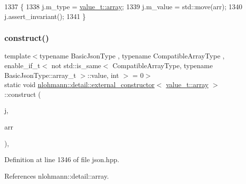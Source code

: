 \begin{DoxyCode}
1337     \{
1338         j.m\_type = \hyperlink{namespacenlohmann_1_1detail_a1ed8fc6239da25abcaf681d30ace4985af1f713c9e000f5d3f280adbd124df4f5}{value\_t::array};
1339         j.m\_value = std::move(arr);
1340         j.assert\_invariant();
1341     \}
\end{DoxyCode}
\mbox{\label{structnlohmann_1_1detail_1_1external__constructor_3_01value__t_1_1array_01_4_a110f50fd5378da876d9a6d6a8d945e37}} 
\subsubsection{\texorpdfstring{construct()}{construct()}\hspace{0.1cm}{\footnotesize\ttfamily [3/5]}}
{\footnotesize\ttfamily template$<$typename Basic\+Json\+Type , typename Compatible\+Array\+Type , enable\+\_\+if\+\_\+t$<$ not std\+::is\+\_\+same$<$ Compatible\+Array\+Type, typename Basic\+Json\+Type\+::array\+\_\+t $>$\+::value, int $>$  = 0$>$ \\
static void \hyperlink{structnlohmann_1_1detail_1_1external__constructor}{nlohmann\+::detail\+::external\+\_\+constructor}$<$ \hyperlink{namespacenlohmann_1_1detail_a1ed8fc6239da25abcaf681d30ace4985af1f713c9e000f5d3f280adbd124df4f5}{value\+\_\+t\+::array} $>$\+::construct (\begin{DoxyParamCaption}\item[{Basic\+Json\+Type \&}]{j,  }\item[{const Compatible\+Array\+Type \&}]{arr }\end{DoxyParamCaption})\hspace{0.3cm}{\ttfamily [inline]}, {\ttfamily [static]}}



Definition at line 1346 of file json.\+hpp.



References nlohmann\+::detail\+::array.



